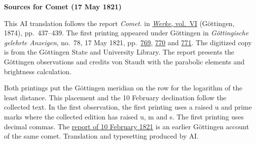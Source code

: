 \clearpage\thispagestyle{empty}
\begin{center}\textbf{Sources for Comet (17 May 1821)}\end{center}
\noindent This AI translation follows the report \textit{Comet.} in \href{https://gdz.sub.uni-goettingen.de/id/PPN236007467}{\textit{Werke}, vol.~VI} (Göttingen, 1874), pp.~437--439. The first printing appeared under Göttingen in \textit{Göttingische gelehrte Anzeigen}, no.~78, 17 May 1821, pp.~\href{https://images.p.sub.uni-goettingen.de/iiif/image/gdz:PPN319721507_1821:00000773/full/1600,/0/default.jpg}{769}, \href{https://images.p.sub.uni-goettingen.de/iiif/image/gdz:PPN319721507_1821:00000774/full/1600,/0/default.jpg}{770} and \href{https://images.p.sub.uni-goettingen.de/iiif/image/gdz:PPN319721507_1821:00000775/full/1600,/0/default.jpg}{771}. The digitized copy is from the Göttingen State and University Library. The report presents the Göttingen observations and credits von Staudt with the parabolic elements and brightness calculation.
\par\smallskip\noindent Both printings put the Göttingen meridian on the row for the logarithm of the least distance. This placement and the 10 February declination follow the collected text. In the first observation, the first printing uses a raised u and prime marks where the collected edition has raised u, m and s. The first printing uses decimal commas. The \hyperlink{native-440-part-lower}{report of 10 February 1821} is an earlier Göttingen account of the same comet. Translation and typesetting produced by AI.
\clearpage
